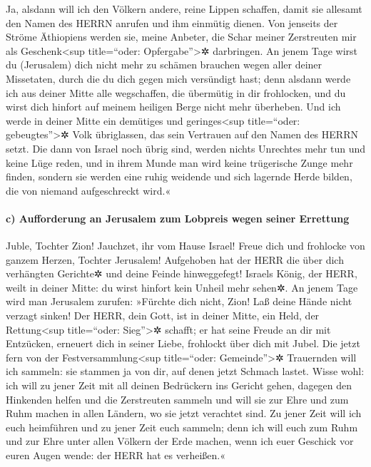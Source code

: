  Ja, alsdann will ich den Völkern andere, reine Lippen
schaffen, damit sie allesamt den Namen des HERRN anrufen und ihm
einmütig dienen.  Von jenseits der Ströme Äthiopiens
werden sie, meine Anbeter, die Schar meiner Zerstreuten mir als
Geschenk\textless sup title=``oder: Opfergabe''\textgreater✲ darbringen.
 An jenem Tage wirst du (Jerusalem) dich nicht mehr zu
schämen brauchen wegen aller deiner Missetaten, durch die du dich gegen
mich versündigt hast; denn alsdann werde ich aus deiner Mitte alle
wegschaffen, die übermütig in dir frohlocken, und du wirst dich hinfort
auf meinem heiligen Berge nicht mehr überheben.  Und ich
werde in deiner Mitte ein demütiges und geringes\textless sup
title=``oder: gebeugtes''\textgreater✲ Volk übriglassen, das sein
Vertrauen auf den Namen des HERRN setzt.  Die dann von
Israel noch übrig sind, werden nichts Unrechtes mehr tun und keine Lüge
reden, und in ihrem Munde man wird keine trügerische Zunge mehr finden,
sondern sie werden eine ruhig weidende und sich lagernde Herde bilden,
die von niemand aufgeschreckt wird.«

\hypertarget{c-aufforderung-an-jerusalem-zum-lobpreis-wegen-seiner-errettung}{%
\paragraph{c) Aufforderung an Jerusalem zum Lobpreis wegen seiner
Errettung}\label{c-aufforderung-an-jerusalem-zum-lobpreis-wegen-seiner-errettung}}

 Juble, Tochter Zion! Jauchzet, ihr vom Hause Israel!
Freue dich und frohlocke von ganzem Herzen, Tochter Jerusalem!
 Aufgehoben hat der HERR die über dich verhängten
Gerichte✲ und deine Feinde hinweggefegt! Israels König, der HERR, weilt
in deiner Mitte: du wirst hinfort kein Unheil mehr sehen✲.
 An jenem Tage wird man Jerusalem zurufen: »Fürchte dich
nicht, Zion! Laß deine Hände nicht verzagt sinken!  Der
HERR, dein Gott, ist in deiner Mitte, ein Held, der Rettung\textless sup
title=``oder: Sieg''\textgreater✲ schafft; er hat seine Freude an dir
mit Entzücken, erneuert dich in seiner Liebe, frohlockt über dich mit
Jubel.  Die jetzt fern von der
Festversammlung\textless sup title=``oder: Gemeinde''\textgreater✲
Trauernden will ich sammeln: sie stammen ja von dir, auf denen jetzt
Schmach lastet.  Wisse wohl: ich will zu jener Zeit mit
all deinen Bedrückern ins Gericht gehen, dagegen den Hinkenden helfen
und die Zerstreuten sammeln und will sie zur Ehre und zum Ruhm machen in
allen Ländern, wo sie jetzt verachtet sind.  Zu jener
Zeit will ich euch heimführen und zu jener Zeit euch sammeln; denn ich
will euch zum Ruhm und zur Ehre unter allen Völkern der Erde machen,
wenn ich euer Geschick vor euren Augen wende: der HERR hat es
verheißen.«
